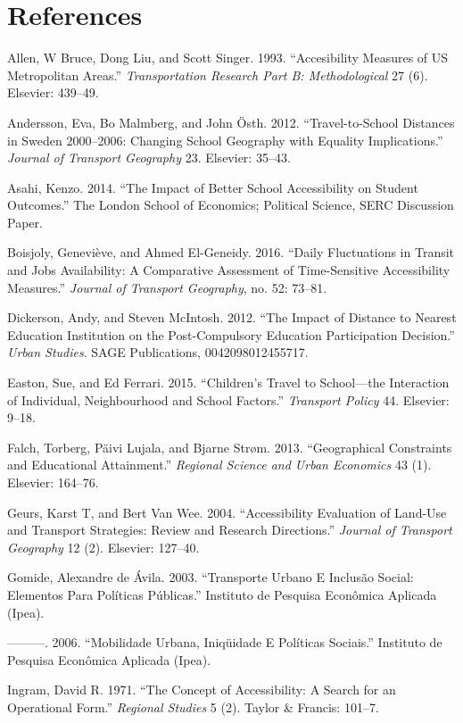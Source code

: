 \documentclass[]{article}
\begin{document}
\section{References}\label{references}

Allen, W Bruce, Dong Liu, and Scott Singer. 1993. ``Accesibility
Measures of US Metropolitan Areas.'' \emph{Transportation Research Part
B: Methodological} 27 (6). Elsevier: 439--49.

Andersson, Eva, Bo Malmberg, and John {Ö}sth. 2012. ``Travel-to-School
Distances in Sweden 2000--2006: Changing School Geography with Equality
Implications.'' \emph{Journal of Transport Geography} 23. Elsevier:
35--43.

Asahi, Kenzo. 2014. ``The Impact of Better School Accessibility on
Student Outcomes.'' The London School of Economics; Political Science,
SERC Discussion Paper.

Boisjoly, Genevi{è}ve, and Ahmed El-Geneidy. 2016. ``Daily Fluctuations
in Transit and Jobs Availability: A Comparative Assessment of
Time-Sensitive Accessibility Measures.'' \emph{Journal of Transport
Geography}, no. 52: 73--81.

Dickerson, Andy, and Steven McIntosh. 2012. ``The Impact of Distance to
Nearest Education Institution on the Post-Compulsory Education
Participation Decision.'' \emph{Urban Studies}. SAGE Publications,
0042098012455717.

Easton, Sue, and Ed Ferrari. 2015. ``Children's Travel to School---the
Interaction of Individual, Neighbourhood and School Factors.''
\emph{Transport Policy} 44. Elsevier: 9--18.

Falch, Torberg, P{ä}ivi Lujala, and Bjarne Str{ø}m. 2013. ``Geographical
Constraints and Educational Attainment.'' \emph{Regional Science and
Urban Economics} 43 (1). Elsevier: 164--76.

Geurs, Karst T, and Bert Van Wee. 2004. ``Accessibility Evaluation of
Land-Use and Transport Strategies: Review and Research Directions.''
\emph{Journal of Transport Geography} 12 (2). Elsevier: 127--40.

Gomide, Alexandre de {Á}vila. 2003. ``Transporte Urbano E Inclusão
Social: Elementos Para Políticas Públicas.'' Instituto de Pesquisa
Econômica Aplicada (Ipea).

---------. 2006. ``Mobilidade Urbana, Iniqüidade E Políticas Sociais.''
Instituto de Pesquisa Econômica Aplicada (Ipea).

Ingram, David R. 1971. ``The Concept of Accessibility: A Search for an
Operational Form.'' \emph{Regional Studies} 5 (2). Taylor \& Francis:
101--7.
\end{document}
